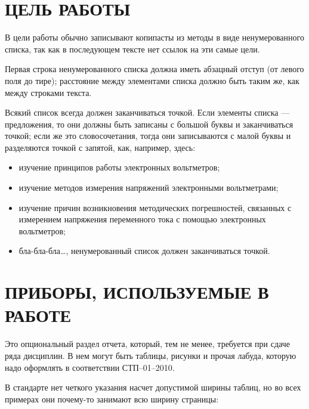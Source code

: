 \documentclass[a4paper,hidelinks,14pt]{extarticle}
\begin{document}

\section{ЦЕЛЬ РАБОТЫ}

В цели работы обычно записывают копипасты из методы в виде ненумерованного списка,
так как в последующем тексте нет ссылок на эти самые цели.

Первая строка ненумерованного списка должна иметь абзацный отступ (от левого поля до тире);
расстояние между элементами списка должно быть таким же, как между строками текста.

Всякий список всегда должен заканчиваться точкой. Если элементы списка ---
предложения, то они должны быть записаны с большой буквы и заканчиваться точкой; если же это
словосочетания, тогда они записываются с малой буквы и разделяются точкой с запятой, как, например, здесь:

\begin{itemize}
	\item изучение принципов работы электронных вольтметров;
	\item изучение методов измерения напряжений электронными вольтметрами;
	\item изучение причин возникновения методических погрешностей, связанных с измерением напряжения переменного тока с помощью электронных вольтметров;
	\item бла-бла-бла\dots, ненумерованный список должен заканчиваться точкой.
\end{itemize}

\newpage

\section{ПРИБОРЫ, ИСПОЛЬЗУЕМЫЕ В РАБОТЕ}

Это опциональный раздел отчета, который, тем не менее, требуется при сдаче ряда дисциплин.
В нем могут быть таблицы, рисунки и прочая лабуда, которую надо оформлять в соответствии СТП–01–2010.

В стандарте нет четкого указания насчет допустимой ширины таблиц, но во всех примерах они почему-то
занимают всю ширину страницы:
\end{document}
